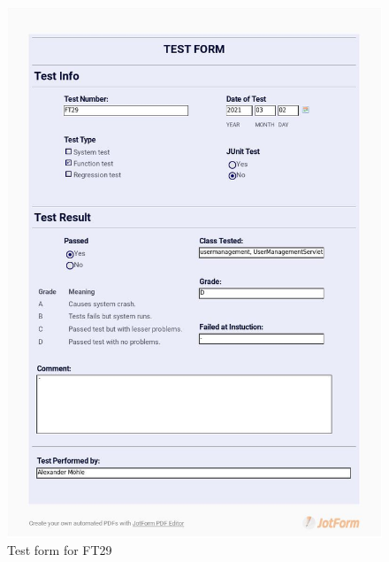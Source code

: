 \documentclass{article}
\begin{document}
 \begin{figure}
     \centering
     \includegraphics[width=13cm]{images/2021-03-02_Alexander_FT29_001}
     \renewcommand\figurename{Figure}
     \caption{Test form for FT29}
     \label{fig:my_label}
 \end{figure}
 
\end{document}
